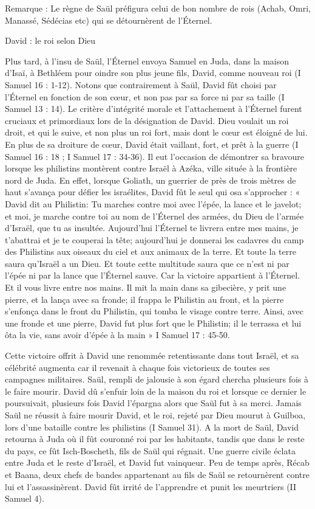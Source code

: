 Remarque : Le règne de Saül préfigura celui de bon nombre de rois (Achab, Omri, Manassé, Sédécias etc) qui se détournèrent de l’Éternel.

David : le roi selon Dieu

Plus tard, à l'insu de Saül, l’Éternel envoya Samuel en Juda, dans la maison d'Isaï, à Bethléem pour oindre son plus jeune fils, David, comme nouveau roi (I Samuel 16 : 1-12). Notons que contrairement à Saül, David fût choisi par l’Éternel en fonction de son cœur, et non pas par sa force ni par sa taille (I Samuel 13 : 14). Le critère d'intégrité morale et l'attachement à l’Éternel furent cruciaux et primordiaux lors de la désignation de David. Dieu voulait un roi droit, et qui le suive, et non plus un roi fort, mais dont le cœur est éloigné de lui. En plus de sa droiture de cœur, David était vaillant, fort, et prêt à la guerre (I Samuel 16 : 18 ; I Samuel 17 : 34-36). Il eut l'occasion de démontrer sa bravoure lorsque les philistins montèrent contre Israël à Azéka, ville située à la frontière nord de Juda. En effet, lorsque Goliath, un guerrier de près de trois mètres de haut s'avança pour défier les israélites, David fût le seul qui osa s'approcher : « David dit au Philistin: Tu marches contre moi avec l'épée, la lance et le javelot; et moi, je marche contre toi au nom de l'Éternel des armées, du Dieu de l'armée d'Israël, que tu as insultée. Aujourd'hui l'Éternel te livrera entre mes mains, je t'abattrai et je te couperai la tête; aujourd'hui je donnerai les cadavres du camp des Philistins aux oiseaux du ciel et aux animaux de la terre. Et toute la terre saura qu'Israël a un Dieu. Et toute cette multitude saura que ce n'est ni par l'épée ni par la lance que l'Éternel sauve. Car la victoire appartient à l'Éternel. Et il vous livre entre nos mains. Il mit la main dans sa gibecière, y prit une pierre, et la lança avec sa fronde; il frappa le Philistin au front, et la pierre s'enfonça dans le front du Philistin, qui tomba le visage contre terre. Ainsi, avec une fronde et une pierre, David fut plus fort que le Philistin; il le terrassa et lui ôta la vie, sans avoir d'épée à la main » I Samuel 17 : 45-50.

Cette victoire offrit à David une renommée retentissante dans tout Israël, et sa célébrité augmenta car il revenait à chaque fois victorieux de toutes ses campagnes militaires. Saül, rempli de jalousie à son égard chercha plusieurs fois à le faire mourir. David dû s'enfuir loin de la maison du roi et lorsque ce dernier le poursuivait, plusieurs fois David l'épargna alors que Saül fut à sa merci.
Jamais Saül ne réussit à faire mourir David, et le roi, rejeté par Dieu mourut à Guilboa, lors d'une bataille contre les philistins (I Samuel 31).
A la mort de Saül, David retourna à Juda où il fût couronné roi par les habitants, tandis que dans le reste du pays, ce fût Isch-Boscheth, fils de Saül qui régnait. Une guerre civile éclata entre Juda et le reste d'Israël, et David fut vainqueur. Peu de temps après, Récab et Baana, deux chefs de bandes appartenant au fils de Saül se retournèrent contre lui et l'assassinèrent. David fût irrité de l'apprendre et punit les meurtriers (II Samuel 4).

